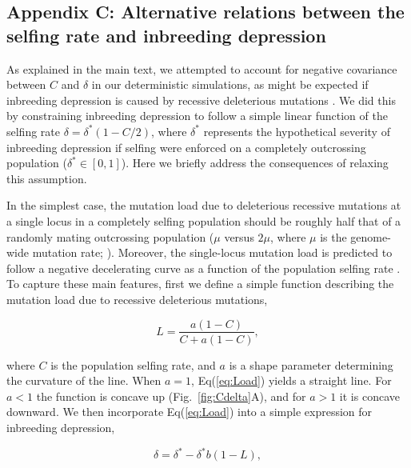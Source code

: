 \documentclass{article}
\begin{document}
\FloatBarrier

\subsection*{Appendix C: Alternative relations between the selfing rate and inbreeding depression}
\renewcommand{\theequation}{C\arabic{equation}}
\setcounter{equation}{0}

As explained in the main text, we attempted to account for negative covariance between $C$ and $\delta$ in our deterministic simulations, as might be expected if inbreeding depression is caused by recessive deleterious mutations \citep{Charlesworth2009}. We did this by constraining inbreeding depression to follow a simple linear function of the selfing rate $\delta = \delta^\ast(1 - C/2)$, where $\delta^\ast$ represents the hypothetical severity of inbreeding depression if selfing were enforced on a completely outcrossing population ($\delta^\ast \in [0,1]$). Here we briefly address the consequences of relaxing this assumption.

In the simplest case, the mutation load due to deleterious recessive mutations at a single locus in a completely selfing population should be roughly half that of a randomly mating outcrossing population ($\mu$ versus $2 \mu$, where $\mu$ is the genome-wide mutation rate; \citealt{OhtaCockerham1974}). Moreover, the single-locus mutation load is predicted to follow a negative decelerating curve as a function of the population selfing rate \citep{OhtaCockerham1974}. To capture these main features, first we define a simple function describing the mutation load due to recessive deleterious mutations,

\begin{equation}\label{eq:Load}
    L = \frac{a (1 - C)}{C + a (1 - C)},
\end{equation}

\noindent where $C$ is the population selfing rate, and $a$ is a shape parameter determining the curvature of the line. When $a = 1$, Eq(\ref{eq:Load}) yields a straight line. For $a < 1$ the function is concave up (Fig.~\ref{fig:Cdelta}A), and for $a > 1$ it is concave downward. We then incorporate Eq(\ref{eq:Load}) into a simple expression for inbreeding depression,

\begin{equation}\label{eq:ID}
    \delta = \delta^{\ast} - \delta^{\ast} b (1 - L),
\end{equation}
\end{document}
